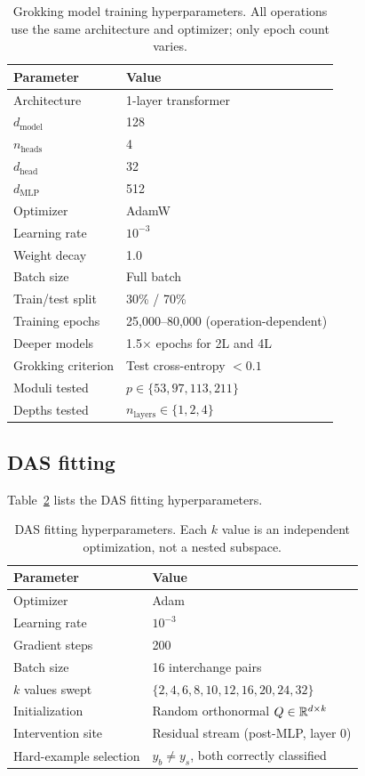 \begin{table}[H]
\centering
\small
\setlength{\tabcolsep}{4pt}
\begin{tabular}{ll}
\toprule
\textbf{Parameter} & \textbf{Value} \\
\midrule
Architecture & 1-layer transformer \\
$d_\text{model}$ & 128 \\
$n_\text{heads}$ & 4 \\
$d_\text{head}$ & 32 \\
$d_\text{MLP}$ & 512 \\
Optimizer & AdamW \\
Learning rate & $10^{-3}$ \\
Weight decay & 1.0 \\
Batch size & Full batch \\
Train/test split & 30\% / 70\% \\
Training epochs & 25{,}000--80{,}000 (operation-dependent) \\
Deeper models & 1.5$\times$ epochs for 2L and 4L \\
Grokking criterion & Test cross-entropy $< 0.1$ \\
Moduli tested & $p \in \{53, 97, 113, 211\}$ \\
Depths tested & $n_\text{layers} \in \{1, 2, 4\}$ \\
\bottomrule
\end{tabular}
\caption{Grokking model training hyperparameters. All operations use the same
architecture and optimizer; only epoch count varies.}
\label{tab:hp_grokking}
\end{table}

\subsection{DAS fitting}

Table~\ref{tab:hp_das} lists the DAS fitting hyperparameters.

\begin{table}[H]
\centering
\small
\begin{tabular}{ll}
\toprule
\textbf{Parameter} & \textbf{Value} \\
\midrule
Optimizer & Adam \\
Learning rate & $10^{-3}$ \\
Gradient steps & 200 \\
Batch size & 16 interchange pairs \\
$k$ values swept & $\{2, 4, 6, 8, 10, 12, 16, 20, 24, 32\}$ \\
Initialization & Random orthonormal $Q \in \mathbb{R}^{d \times k}$ \\
Intervention site & Residual stream (post-MLP, layer 0) \\
Hard-example selection & $y_b \neq y_s$, both correctly classified \\
\bottomrule
\end{tabular}
\caption{DAS fitting hyperparameters. Each $k$ value is an independent
optimization, not a nested subspace.}
\label{tab:hp_das}
\end{table}

